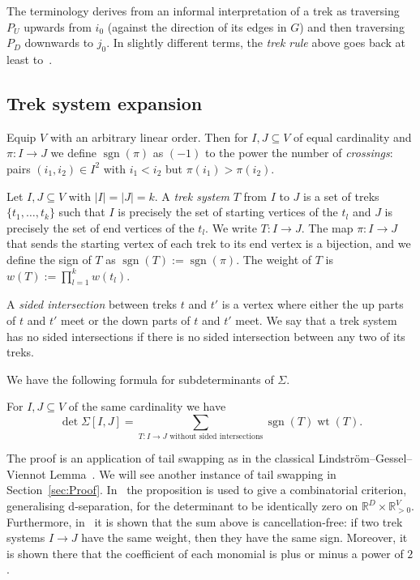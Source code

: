 \documentclass[ALCO,ThmDefs,Unicode]{cedram}
\DeclareMathOperator{\sgn}{sgn}
\DeclareMathOperator{\wt}{wt}
\newcommand{\RR}{\mathbb{R}}
\begin{document}
The terminology derives from an informal interpretation of a trek as traversing $P_U$ upwards from $i_0$ (\ie against the direction of its edges in $G$) and then traversing $P_D$ downwards to $j_0$. In slightly different terms, the \emph{trek rule} above goes back at least to~\cite{Wright34}.

\subsection*{Trek system expansion}

Equip $V$ with an arbitrary linear order. Then for $I,J \subseteq V$ of equal cardinality and $\pi:I \to J$ we define $\sgn(\pi)$ as $(-1)$ to the power the number of \emph{crossings}: pairs $(i_1,i_2) \in I^2$ with $i_1<i_2$ but $\pi(i_1)>\pi(i_2)$.

\begin{defi}
Let $I,J \subseteq V$ with $|I|=|J|=k$. A \emph{trek system} $T$ from $I$ to $J$ is a set of treks $\{t_1,\ldots,t_k\}$ such that $I$ is precisely the set of starting vertices of the $t_l$ and $J$ is precisely the set of end vertices of the $t_l$. We write $T:I \to J$. The map $\pi:I \to J$ that sends the starting vertex of each trek to its end vertex is a bijection, and we define the sign of $T$ as $\sgn(T):=\sgn(\pi)$. The weight of $T$ is $w(T):=\prod_{l=1}^k w(t_l)$.
\end{defi}

\begin{defi}
A \emph{sided intersection} between treks $t$ and $t'$ is a vertex where either the up parts of $t$ and $t'$ meet or the down parts of $t$ and $t'$ meet. We say that a trek system has no sided intersections if there is no sided intersection between any two of its treks.
\end{defi}

We have the following formula for subdeterminants of $\Sigma$.

\begin{prop}
For $I,J \subseteq V$ of the same cardinality we have
\begin{equation}
\det \Sigma[I,J]=\sum_{T:I \to J \text{ without sided
intersections}} \sgn(T) \wt(T). \label{eq:nosided}
\tag{$\ast$}
\end{equation}
\end{prop}

The proof is an application of tail swapping as in the classical Lindstr\"om--Gessel--Viennot Lemma~\cite{Gessel85}. We will see another instance of tail swapping in Section~\ref{sec:Proof}. In~\cite{Draisma09d} the proposition is used to give a combinatorial criterion, generalising d-sepa\-ra\-tion, for the determinant to be identically zero on $\RR^D \times \RR_{>0}^V$. Furthermore, in~\cite{Draisma12h} it is shown that the sum above is cancellation-free: if two trek systems $I \to J$ have the same weight, then they have the same sign. Moreover, it is shown there that the coefficient of each monomial is plus or minus a power of $2$.
\end{document}
